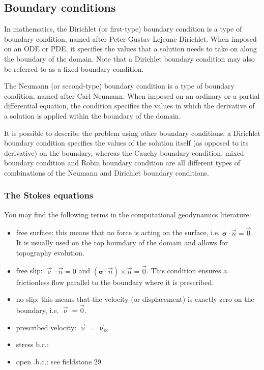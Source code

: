 \newpage
\subsection{Boundary conditions}

In mathematics, the Dirichlet (or first-type) 
boundary condition is a type of boundary condition, named after Peter Gustav Lejeune Dirichlet.
When imposed on an ODE or PDE, it specifies the values that a solution needs 
to take on along the boundary of the domain.
Note that a Dirichlet boundary condition may also be referred to as a fixed boundary condition. 

The Neumann (or second-type) boundary condition is a type of boundary condition, 
named after Carl Neumann. When imposed on an ordinary or a partial differential equation, 
the condition specifies the values in which the derivative of a solution is 
applied within the boundary of the domain.

It is possible to describe the problem using other boundary conditions: 
a Dirichlet boundary condition specifies the values of the solution itself 
(as opposed to its derivative) on the boundary, whereas the Cauchy boundary condition, mixed boundary condition and Robin boundary condition are all different types of combinations of the Neumann and Dirichlet boundary conditions.



\subsubsection{The Stokes equations}

You may find the following terms in the computational geodynamics literature:

\begin{itemize}
\item { free surface}: this means that no force is acting on the surface, i.e. ${\bm \sigma}\cdot {\vec n}={\vec 0}$. It is usually used on the top boundary of the domain and allows for topography evolution.
\item { free slip}: ${\vec \upnu}\cdot \vec n = 0$ and $({\bm \sigma}\cdot{\vec n})\times {\vec n}={\vec 0}$. This condition ensures a frictionless flow parallel to the boundary where it is prescribed.
\item { no slip}: this means that the velocity (or displacement) is exactly zero on the boundary, i.e. ${\vec \upnu}={\vec 0}$.
\item { prescribed velocity}: ${\vec \upnu}={\vec \upnu}_{bc}$
\item stress b.c.: 
\item open .b.c.: see fieldstone 29. 
\end{itemize}


